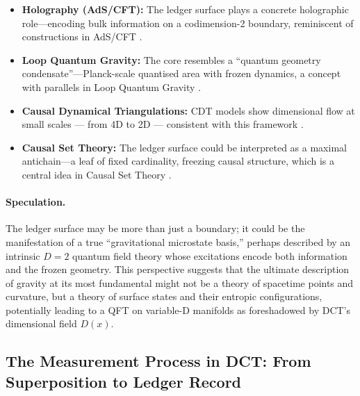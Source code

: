 \documentclass[a4paper, 12pt, oneside]{book}
\numberwithin{equation}{chapter}
\begin{document}
\begin{itemize}
  \item \textbf{Holography (AdS/CFT):}  
        The ledger surface plays a concrete holographic role—encoding bulk information on a codimension-2 boundary, reminiscent of constructions in AdS/CFT \cite{Susskind1995, tHooft1993}. %
  \item \textbf{Loop Quantum Gravity:}  
        The core resembles a “quantum geometry condensate”—Planck-scale quantised area with frozen dynamics, a concept with parallels in Loop Quantum Gravity \cite{Rovelli2008LoopQuantumGravity}.
  \item \textbf{Causal Dynamical Triangulations:}  
        CDT models show dimensional flow at small scales — from 4D to 2D — consistent with this framework \cite{Ambjorn2005, Loll2019}. %
  \item \textbf{Causal Set Theory:}  
        The ledger surface could be interpreted as a maximal antichain—a leaf of fixed cardinality, freezing causal structure, which is a central idea in Causal Set Theory \cite{Sorkin1991SpacetimeAsCausalSet, Dowker2006CausalSetsAndTheDeepStructureOfSpacetime}.
\end{itemize}

\paragraph{Speculation.}
The ledger surface may be more than just a boundary; it could be the manifestation of a true “gravitational microstate basis,” perhaps described by an intrinsic $D=2$ quantum field theory \cite{StromingerVafa1996} whose excitations encode both information and the frozen geometry. This perspective suggests that the ultimate description of gravity at its most fundamental might not be a theory of spacetime points and curvature, but a theory of surface states and their entropic configurations, potentially leading to a QFT on variable-D manifolds as foreshadowed by DCT's dimensional field $D(x)$.

\subsection[The Measurement Process]{The Measurement Process in DCT: From Superposition to Ledger Record}
\label{sec:DCTQuantumMeasurement}
\end{document}
